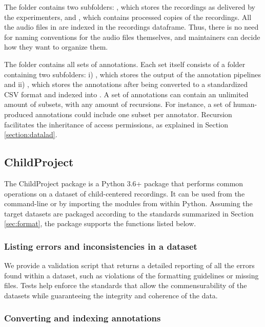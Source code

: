 \documentclass[smallextended]{svjour3}       %
\begin{document}
The  folder contains two subfolders: , which stores the recordings as delivered by the experimenters, and , which contains processed copies of the recordings. All the audio files in  are indexed in the recordings dataframe. Thus, there is no need for naming conventions for the audio files themselves, and maintainers can decide how they want to organize them.

The  folder contains all sets of annotations. Each set itself consists of a folder containing two subfolders: i) , which stores the output of the annotation pipelines and ii) , which stores the annotations after being converted to a standardized CSV format and indexed into . A set of annotations can contain an unlimited amount of subsets, with any amount of recursions. For instance, a set of human-produced annotations could include one subset per annotator. Recursion facilitates the inheritance of access permissions, as explained in Section \ref{section:datalad}.


\subsection{ChildProject}\label{section:childproject}

The ChildProject package is a Python 3.6+ package that performs common operations on a dataset of child-centered recordings. It can be used from the command-line or by importing the modules from within Python. Assuming the target datasets are packaged according to the standards summarized in Section \ref{sec:format}, the package supports the functions listed below.

\subsubsection*{Listing errors and inconsistencies in a dataset}

We provide a validation script that returns a detailed reporting of all the errors found within a dataset, such as violations of the formatting guidelines or missing files. Tests help enforce the standards that allow the commensurability of the datasets while guaranteeing the integrity and coherence of the data.

\subsubsection*{Converting and indexing annotations}\label{section:annotations}
\end{document}
